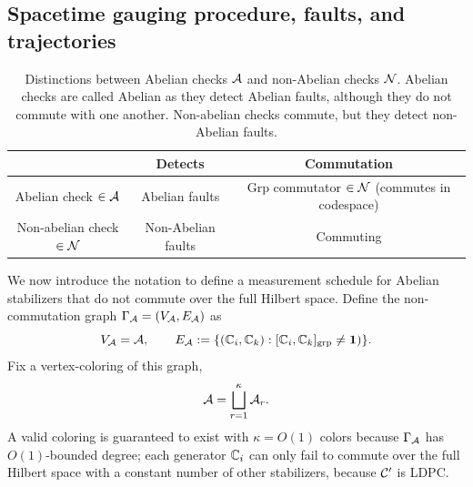 \documentclass[11pt]{article}
\begin{document}
\subsection{Spacetime gauging procedure, faults, and trajectories} \label{sec:spacetime-setup}

\begin{table}
    \centering
    \begin{tabular}{|c|c|c|}
        \hline
         & \textbf{Detects} & \textbf{Commutation} \\
        \hline
        Abelian check $\in \mathcal{A}$ & Abelian faults & Grp commutator $\in \mathcal{N}$ (commutes in codespace)  \\
        Non-abelian check $\in \mathcal{N}$ & Non-Abelian faults & Commuting \\
        \hline
    \end{tabular}
    \caption{Distinctions between Abelian checks $\mathcal{A}$ and non-Abelian checks $\mathcal{N}$. Abelian checks are called Abelian as they detect Abelian faults, although they do not commute with one another. Non-abelian checks commute, but they detect non-Abelian faults.}
    \label{tab:checks}
\end{table}

We now introduce the notation to define a measurement schedule for Abelian stabilizers that do not commute over the full Hilbert space. Define the non-commutation graph $\Gamma_{\mathcal{A}} = (V_{\mathcal{A}}, E_{\mathcal{A}})$ as 
\[
    V_{\mathcal{A}} = \mathcal{A},\qquad E_{\mathcal{A}} :=\{(\mathbb{C}_{i},\mathbb{C}_{k}): [ \mathbb{C}_{i}, \mathbb{C}_{k} ]_{\text{grp}} \neq \mathbf{1}
    )\}.
\]
Fix a vertex-coloring of this graph, 
\[
\mathcal{A} = \bigsqcup_{r=1}^\kappa \mathcal{A}_r.
\]
A valid coloring is guaranteed to exist with $\kappa=O(1)$ colors because $\Gamma_{\mathcal{A}}$ has $O(1)$-bounded degree; each generator $\mathbb{C}_{i}$ can only fail to commute over the full Hilbert space with a constant number of other stabilizers, because $\mathcal{C}'$ is LDPC.
\end{document}
